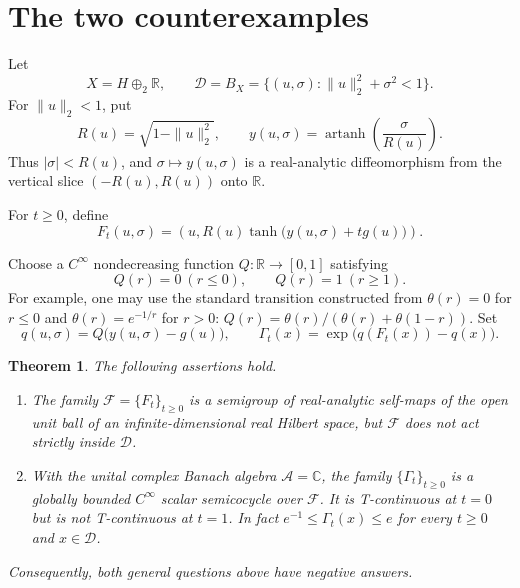 \documentclass[11pt]{article}
\newtheorem{theorem}{Theorem}
\newcommand{\R}{\mathbb R}
\newcommand{\C}{\mathbb C}
\newcommand{\D}{\mathcal D}
\newcommand{\F}{\mathcal F}
\begin{document}
\section{The two counterexamples}

Let
\[
 X=H\oplus_2\R,\qquad
 \D=B_X=\{(u,\sigma):\|u\|_2^2+\sigma^2<1\}.
\]
For $\|u\|_2<1$, put
\[
 R(u)=\sqrt{1-\|u\|_2^2},
 \qquad
 y(u,\sigma)=\operatorname{artanh}\!\left(\frac{\sigma}{R(u)}\right).
\]
Thus $|\sigma|<R(u)$, and $\sigma\mapsto y(u,\sigma)$ is a real-analytic
diffeomorphism from the vertical slice $(-R(u),R(u))$ onto $\R$.

For $t\geq0$, define
\begin{equation}\label{eq:F}
 F_t(u,\sigma)=
 \left(u,R(u)\tanh\bigl(y(u,\sigma)+t g(u)\bigr)\right).
\end{equation}

Choose a $C^\infty$ nondecreasing function $Q:\R\to[0,1]$ satisfying
\begin{equation}\label{eq:Q}
 Q(r)=0\ (r\leq0),\qquad Q(r)=1\ (r\geq1).
\end{equation}
For example, one may use the standard transition constructed from
$\theta(r)=0$ for $r\leq0$ and $\theta(r)=e^{-1/r}$ for $r>0$:
$Q(r)=\theta(r)/(\theta(r)+\theta(1-r))$. Set
\begin{equation}\label{eq:qGamma}
 q(u,\sigma)=Q\bigl(y(u,\sigma)-g(u)\bigr),
 \qquad
 \Gamma_t(x)=\exp\bigl(q(F_t(x))-q(x)\bigr).
\end{equation}

\begin{theorem}\label{thm:main}
The following assertions hold.
\begin{enumerate}
\item The family $\F=\{F_t\}_{t\geq0}$ is a semigroup of real-analytic
self-maps of the open unit ball of an infinite-dimensional real Hilbert space,
but $\F$ does not act strictly inside $\D$.
\item With the unital complex Banach algebra $\mathcal A=\C$, the family
$\{\Gamma_t\}_{t\geq0}$ is a globally bounded $C^\infty$ scalar semicocycle
over $\F$. It is T-continuous at $t=0$ but is not T-continuous at $t=1$.
In fact $e^{-1}\leq\Gamma_t(x)\leq e$ for every $t\geq0$ and $x\in\D$.
\end{enumerate}
Consequently, both general questions above have negative answers.
\end{theorem}
\end{document}

